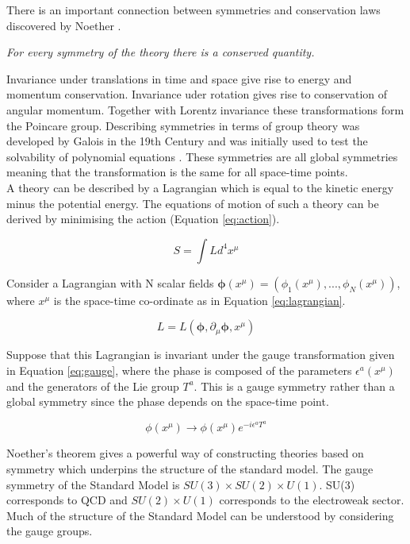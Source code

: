 There is an important connection between symmetries and conservation laws
discovered by Noether \cite{noether}.

\begin{center}
{\it For every symmetry of the theory there is a conserved quantity.} \\
\end{center}

Invariance under translations in time and space give rise to energy and momentum
conservation. Invariance uder rotation gives rise to conservation of angular
momentum. Together with Lorentz invariance these transformations form the
Poincare group. Describing symmetries in terms of group theory was developed by
Galois in the 19th Century and was initially used to test the solvability of 
polynomial equations \cite{galois}. These symmetries are all global symmetries
meaning that the transformation is the same for all space-time points. \\

A theory can be described by a Lagrangian which is equal to the kinetic energy
minus the potential energy. The equations of motion of such a theory can be
derived by minimising the action (Equation \ref{eq:action}).

\begin{equation}
S = \int L d^{4}x^{\mu}
\label{eq:action}
\end{equation}

Consider a Lagrangian with N scalar fields $\mathbf{\phi}(x^{\mu}) =
\left(\phi_{1}(x^{\mu}),...,\phi_{N}(x^{\mu})\right)$, where $x^{\mu}$ is the
space-time co-ordinate as in Equation \ref{eq:lagrangian}.

\begin{equation}
L = L(\mathbf{\phi}, \partial_{\mu}\mathbf{\phi}, x^{\mu})
\label{eq:lagrangian}
\end{equation}

Suppose that this Lagrangian is invariant under the gauge transformation given
in Equation \ref{eq:gauge}, where the phase is composed of the parameters 
$\epsilon^{a}\left(x^{\mu}\right)$ and the generators of the Lie group $T^{a}$. 
This is a gauge symmetry rather than a global symmetry since the phase depends 
on the space-time point. 

\begin{equation} 
\phi(x^{\mu})\rightarrow \phi(x^{\mu})e^{-i\epsilon^{a}T^{a}}
\label{eq:gauge}
\end{equation}

Noether's theorem gives a powerful way of constructing theories based on 
symmetry which underpins the structure of the standard model. The gauge
symmetry of the Standard Model is $SU(3)\times SU(2)\times U(1)$. SU(3) 
corresponds to QCD and $SU(2)\times U(1)$ corresponds to the electroweak
sector. Much of the structure of the Standard Model can be understood by 
considering the gauge groups.

